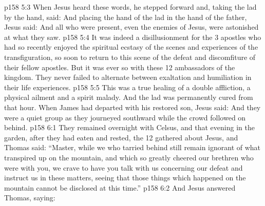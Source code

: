 \vs p158 5:3 When Jesus heard these words, he stepped forward and, taking the lad by the hand, said:  And placing the hand of the lad in the hand of the father, Jesus said:  And all who were present, even the enemies of Jesus, were astonished at what they saw.
\vs p158 5:4 It was indeed a disillusionment for the 3 apostles who had so recently enjoyed the spiritual ecstasy of the scenes and experiences of the transfiguration, so soon to return to this scene of the defeat and discomfiture of their fellow apostles. But it was ever so with these 12 ambassadors of the kingdom. They never failed to alternate between exaltation and humiliation in their life experiences.
\vs p158 5:5 This was a true healing of a double affliction, a physical ailment and a spirit malady. And the lad was permanently cured from that hour. When James had departed with his restored son, Jesus said:  And they were a quiet group as they journeyed southward while the crowd followed on behind.
\vs p158 6:1 They remained overnight with Celsus, and that evening in the garden, after they had eaten and rested, the 12 gathered about Jesus, and Thomas said: “Master, while we who tarried behind still remain ignorant of what transpired up on the mountain, and which so greatly cheered our brethren who were with you, we crave to have you talk with us concerning our defeat and instruct us in these matters, seeing that those things which happened on the mountain cannot be disclosed at this time.”
\vs p158 6:2 And Jesus answered Thomas, saying: 
